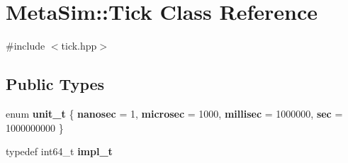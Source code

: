 \hypertarget{classMetaSim_1_1Tick}{}\section{Meta\+Sim\+:\+:Tick Class Reference}
\label{classMetaSim_1_1Tick}


{\ttfamily \#include $<$tick.\+hpp$>$}

\subsection*{Public Types}
\begin{DoxyCompactItemize}
\item 
enum {\bfseries unit\+\_\+t} \{ {\bfseries nanosec} = 1, 
{\bfseries microsec} = 1000, 
{\bfseries millisec} = 1000000, 
{\bfseries sec} = 1000000000
 \}\hypertarget{classMetaSim_1_1Tick_ad4dee6f558fbd1f3311a571360a14bbe}{}\label{classMetaSim_1_1Tick_ad4dee6f558fbd1f3311a571360a14bbe}

\item 
typedef int64\+\_\+t {\bfseries impl\+\_\+t}\hypertarget{classMetaSim_1_1Tick_aae7d602da4877764ee02af8c8e4426b8}{}\label{classMetaSim_1_1Tick_aae7d602da4877764ee02af8c8e4426b8}

\end{DoxyCompactItemize}
